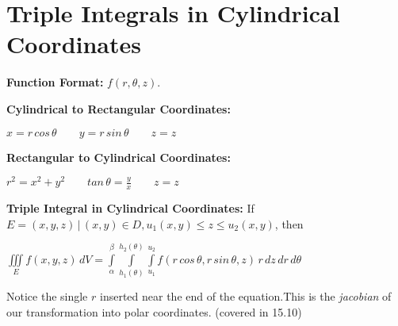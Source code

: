 \documentclass{report}
\begin{document}
	\section{Triple Integrals in Cylindrical Coordinates}
		\begin{itemize}\addtolength{\leftskip}{2em}
			\item \textbf{Function Format:} $f(r,\theta,z)$.
			\item \textbf{Cylindrical to Rectangular Coordinates:}
			\begin{center}
			$x=r\,cos\,\theta\quad\quad y=r\,sin\,\theta\quad\quad z=z$
			\end{center}
			\item \textbf{Rectangular to Cylindrical Coordinates:}
			\begin{center}
			\item $r^2=x^2+y^2\quad\quad tan\,\theta = \frac{y}{x}\quad\quad z=z$
			\end{center}
			\item \textbf{Triple Integral in Cylindrical Coordinates:} \newline If $E={(x,y,z)\,|\, (x,y)\in D,u_1(x,y)\le z \le u_2(x,y)}$, then
			\begin{center}
			$\iiint\limits_{E}f(x,y,z)\,dV=\int\limits_{\alpha}^{\beta}\int\limits_{h_1(\theta)}^{h_2(\theta)}\int\limits_{u_1}^{u_2}f(r\,cos\,\theta,r\,sin\,\theta,z)\,r\,dz\,dr\,d\theta$
			\end{center}			
			\begin{center}
			\small Notice the single $r$ inserted near the end of the equation.\newline This is the \textit{jacobian} of our transformation into polar coordinates. (covered in 15.10)
			\end{center}
		\end{itemize}
		\newpage
\end{document}
